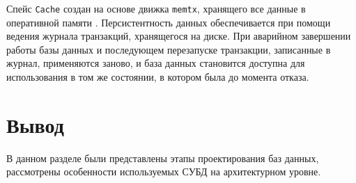 Спейс \texttt{Cache} создан на основе движка \texttt{memtx}, хранящего все данные в оперативной памяти \cite{tntengines}. Персистентность данных обеспечивается при помощи ведения журнала транзакций, хранящегося на диске. При аварийном завершении работы базы данных и последующем перезапуске транзакции, записанные в журнал, применяются заново, и база данных становится доступна для использования в том же состоянии, в котором была до момента отказа.

\section*{Вывод}

В данном разделе были представлены этапы проектирования баз данных, рассмотрены особенности используемых СУБД на архитектурном уровне.